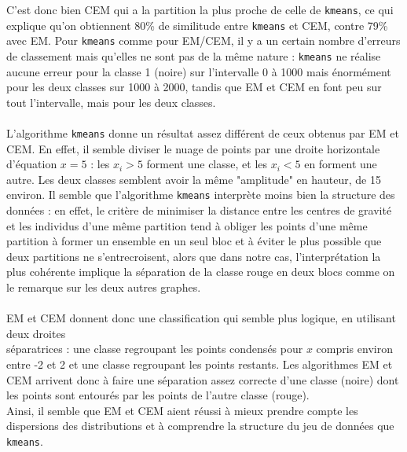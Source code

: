 \documentclass[a4paper, 10pt]{article}
\begin{document}
C'est donc bien CEM qui a la partition  la plus proche de celle de \texttt{kmeans},
ce qui explique qu'on obtiennent 80\% de similitude entre \texttt{kmeans} et CEM, contre 79\% avec EM.
Pour \texttt{kmeans} comme pour EM/CEM, il y a un certain nombre d’erreurs de classement mais qu'elles ne sont pas de la même nature :
\texttt{kmeans} ne réalise aucune erreur pour la classe 1 (noire) sur l'intervalle 0 à 1000 mais énormément pour les deux classes sur
1000 à 2000, tandis que EM et CEM en font peu sur tout l'intervalle, mais pour les deux classes.\\ \\
L'algorithme \texttt{kmeans} donne un résultat assez différent de ceux obtenus par EM et CEM.
En effet, il semble diviser le nuage de points par une droite horizontale d'équation $x = 5$ :
les $x_{i} > 5$  forment une classe, et les $x_{i} < 5$ en forment une autre.
Les deux classes semblent avoir la même "amplitude" en hauteur, de 15 environ. 
Il semble que l'algorithme \texttt{kmeans} interprète moins bien la structure des données :
en effet, le critère de minimiser la distance entre les centres de gravité et les individus d’une même partition tend à obliger
les points d'une même partition à former un ensemble en un seul bloc et à éviter le plus possible que deux partitions ne s'entrecroisent,
alors que dans notre cas, l’interprétation la plus cohérente implique la séparation de la classe rouge en deux blocs comme
on le remarque sur les deux autres graphes.\\ \\
EM et CEM donnent donc une classification qui semble plus logique, en utilisant deux droites \\ séparatrices :
une classe regroupant les points condensés pour $x$ compris environ entre -2 et 2 et une classe regroupant les points restants.
Les algorithmes EM et CEM arrivent donc à faire une séparation assez correcte d'une classe (noire) dont les points sont entourés par
les points de l'autre classe (rouge).\\
Ainsi, il semble que EM et CEM aient réussi à mieux prendre compte les dispersions des distributions et à comprendre
la structure du jeu de données que \texttt{kmeans}.\\
\end{document}
